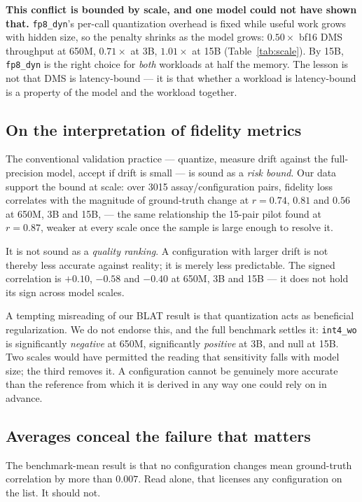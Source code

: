 \documentclass[11pt]{article}
\newcommand{\cfg}[1]{\texttt{#1}}
\begin{document}
\textbf{This conflict is bounded by scale, and one model could not have shown
that.} \cfg{fp8\_dyn}'s per-call quantization overhead is fixed while useful
work grows with hidden size, so the penalty shrinks as the model grows:
$0.50\times$ bf16 DMS throughput at 650M, $0.71\times$ at 3B, $1.01\times$ at 15B
(Table~\ref{tab:scale}). By 15B, \cfg{fp8\_dyn} is the right choice for
\emph{both} workloads at half the memory. The lesson is not that DMS is
latency-bound --- it is that whether a workload is latency-bound is a property
of the model and the workload together.

\subsection{On the interpretation of fidelity metrics}

The conventional validation practice --- quantize, measure drift against the
full-precision model, accept if drift is small --- is sound as a
\emph{risk bound}. Our data support the bound at scale: over 3015
assay/configuration pairs, fidelity loss correlates with the magnitude of
ground-truth change at $r = 0.74$, $0.81$ and $0.56$ at 650M, 3B and 15B,
--- the same relationship the 15-pair pilot found at $r = 0.87$, weaker at
every scale once the sample is large enough to resolve it.

It is not sound as a \emph{quality ranking}. A configuration with larger drift
is not thereby less accurate against reality; it is merely less predictable. The
signed correlation is $+0.10$, $-0.58$ and $-0.40$ at 650M, 3B and 15B --- it
does not hold its sign across model scales.

A tempting misreading of our BLAT result is that quantization acts as beneficial
regularization. We do not endorse this, and the full benchmark settles it:
\cfg{int4\_wo} is significantly \emph{negative} at 650M, significantly
\emph{positive} at 3B, and null at 15B. Two scales would have permitted the
reading that sensitivity falls with model size; the third removes it. A
configuration cannot be genuinely more accurate than the reference from which it
is derived in any way one could rely on in advance.

\subsection{Averages conceal the failure that matters}

The benchmark-mean result is that no configuration changes mean ground-truth
correlation by more than $0.007$. Read alone, that licenses any configuration on
the list. It should not.
\end{document}
